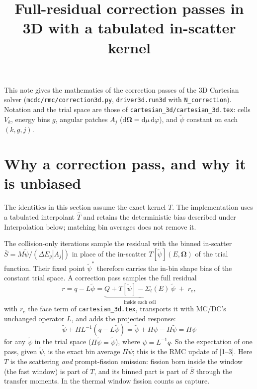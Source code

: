 \documentclass[11pt]{article}
\title{Full-residual correction passes in 3D with a tabulated in-scatter kernel}
\date{}
\newcommand{\tpsi}{\tilde\psi}
\newcommand{\Sbar}{\bar S}
\newcommand{\Sigt}{\Sigma_t}
\newcommand{\Om}{\boldsymbol\Omega}
\begin{document}
\maketitle

\noindent This note gives the mathematics of the correction passes of the 3D
Cartesian solver (\texttt{mcdc/rmc/correction3d.py}, \texttt{driver3d.run3d} with
\texttt{N\_correction}). Notation and the trial space are those of
\texttt{cartesian\_3d/cartesian\_3d.tex}: cells $V_k$, energy bins $g$, angular
patches $A_j$ ($\mathrm d\Om = \mathrm d\mu\,\mathrm d\varphi$), and $\tpsi$ constant
on each $(k,g,j)$.

\section{Why a correction pass, and why it is unbiased}

The identities in this section assume the exact kernel $T$. The implementation
uses a tabulated interpolant $\hat T$ and retains the deterministic bias described
under Interpolation below; matching bin averages does not remove it.

The collision-only iterations sample the residual with the binned in-scatter
$\Sbar = M\tpsi/(\Delta E_g|A_j|)$ in place of the in-scatter $T[\tpsi](E,\Om)$ of the
trial function. Their fixed point $\tpsi^*$ therefore carries the in-bin shape bias
of the constant trial space. A correction pass samples the full residual
\begin{equation}
  r = q - L\tpsi = \underbrace{Q + T[\tpsi] - \Sigt(E)\,\tpsi}_{\text{inside each cell}}
  \; + \; r_e ,
\end{equation}
with $r_e$ the face term of \texttt{cartesian\_3d.tex}, transports it with MC/DC's
unchanged operator $L$, and adds the projected response:
\begin{equation}
  \tpsi + \Pi L^{-1}(q - L\tpsi) = \tpsi + \Pi\psi - \Pi\tpsi = \Pi\psi
  \label{eq:unbiased}
\end{equation}
for any $\tpsi$ in the trial space ($\Pi\tpsi=\tpsi$), where $\psi=L^{-1}q$. So the
expectation of one pass, given $\tpsi$, is the exact bin average $\Pi\psi$; this is
the RMC update of [1--3]. Here $T$ is the scattering \emph{and} prompt-fission
emission: fission born inside the window (the fast window) is part of $T$, and its
binned part is part of $\Sbar$ through the transfer moments. In the thermal window
fission counts as capture.
\end{document}
